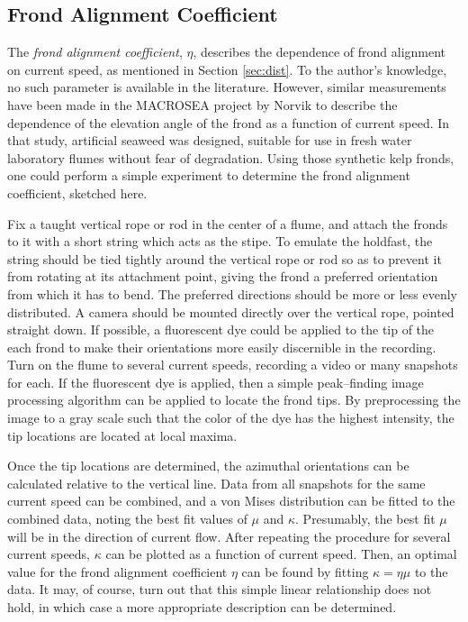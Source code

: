 \subsection{Frond Alignment Coefficient}
The \textit{frond alignment coefficient}, $\eta$, describes the dependence of frond alignment on current speed, as mentioned in Section \ref{sec:dist}.
To the author's knowledge, no such parameter is available in the literature.
However, similar measurements have been made in the MACROSEA project by Norvik \cite{norvik_design_2017} to describe
the dependence of the elevation angle of the frond as a function of current speed.
In that study, artificial seaweed was designed, suitable for use in fresh water laboratory flumes without fear of degradation.
Using those synthetic kelp fronds, one could perform a simple experiment to determine the frond alignment coefficient, sketched here.

Fix a taught vertical rope or rod in the center of a flume, and attach the fronds to it with a short string which acts as the stipe.
To emulate the holdfast, the string should be tied tightly around the vertical rope or rod so as to prevent it from rotating at its attachment point,
giving the frond a preferred orientation from which it has to bend.
The preferred directions should be more or less evenly distributed.
A camera should be mounted directly over the vertical rope, pointed straight down.
If possible, a fluorescent dye could be applied to the tip of the each frond to make their orientations more easily discernible in the recording.
Turn on the flume to several current speeds, recording a video or many snapshots for each.
If the fluorescent dye is applied, then a simple peak--finding image processing algorithm can be applied to locate the frond tips.
By preprocessing the image to a gray scale such that the color of the dye has the highest intensity,
the tip locations are located at local maxima.

Once the tip locations are determined, the azimuthal orientations can be calculated relative to the vertical line.
Data from all snapshots for the same current speed can be combined, and a von Mises distribution can be fitted to the combined data,
noting the best fit values of $\mu$ and $\kappa$.
Presumably, the best fit $\mu$ will be in the direction of current flow.
After repeating the procedure for several current speeds, $\kappa$ can be plotted as a function of current speed.
Then, an optimal value for the frond alignment coefficient $\eta$ can be found by fitting $\kappa = \eta\mu$ to the data.
It may, of course, turn out that this simple linear relationship does not hold, in which case a more appropriate description can be determined.

